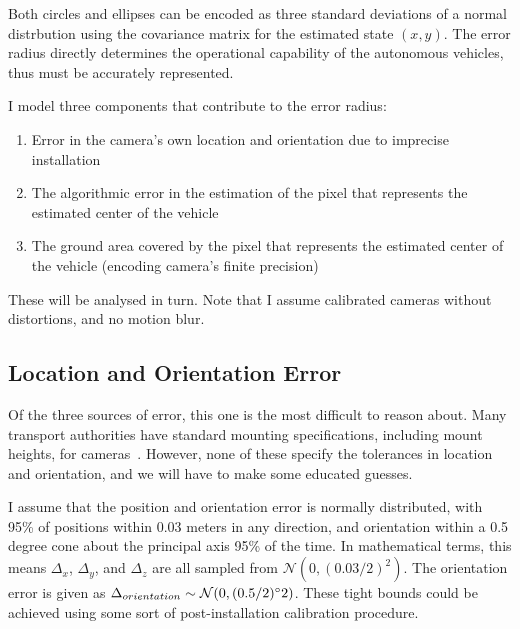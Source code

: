\documentclass[a4paper,12pt,twoside,openright]{report}
\begin{document}
Both circles and ellipses can be encoded as three standard deviations of a normal distrbution
using the covariance matrix for the estimated state $(x,y)$. The error radius directly determines
the operational capability of the autonomous vehicles, thus must be accurately represented.

I model three components that contribute to the error radius:
\begin{enumerate}
    \item Error in the camera's own location and orientation due to imprecise installation
    \item The algorithmic error in the estimation of the pixel that represents the estimated center of the vehicle
    \item The ground area covered by the pixel that represents the estimated center of the vehicle (encoding camera's finite precision)
\end{enumerate}
 
These will be analysed in turn. Note that I assume calibrated cameras without distortions, and no motion blur.

\subsection{Location and Orientation Error}

Of the three sources of error, this one is the most difficult to reason about. 
Many transport authorities have standard mounting specifications, including mount heights, for cameras~\cite{StreetscapeGuideance}.
However, none of these specify the tolerances in location and orientation, and we will have to make some educated guesses.

I assume that the position and orientation error is normally distributed, with
95\% of positions within 0.03 meters in any direction, 
and orientation within a 0.5 degree cone about the principal axis 95\% of the time.
In mathematical terms, this means $\Delta_{x}$, $\Delta_{y}$, and $\Delta_{z}$ 
are all sampled from $\mathcal{N}(0, (0.03/2)^2)$. The orientation error is given as
$\Delta_{orientation} \sim \mathcal{N}(0, (0.5/2)\degree2)$.
These tight bounds could be achieved using some sort of post-installation 
calibration procedure. 


\end{document}
